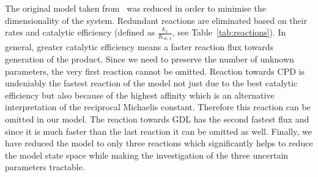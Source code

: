 \documentclass{llncs}
\begin{document}


The original model taken from~\cite{dvorak2014engineering} was reduced in order to minimise the dimensionality of the system.
Redundant reactions are eliminated based on their rates and catalytic efficiency (defined as $\frac{k_x}{K_{m,x}}$,  see Table~\ref{tab:reactions}).
In general, greater catalytic efficiency means a faster reaction flux towards generation of the product. Since we need to preserve the number of unknown parameters, the very first reaction cannot be omitted. Reaction towards CPD is undeniably the fastest reaction of the model not just due to the best catalytic efficiency but also because of the highest affinity which is an alternative interpretation of the reciprocal Michaelis constant. Therefore this reaction can be omitted in our model. The reaction towards GDL has the second fastest flux and since it is much faster than the last reaction %
 it can be omitted as well.
Finally, we have reduced the model to only three reactions which significantly helps to reduce the model state space while making the investigation of the three uncertain parameters tractable. 
\end{document}
